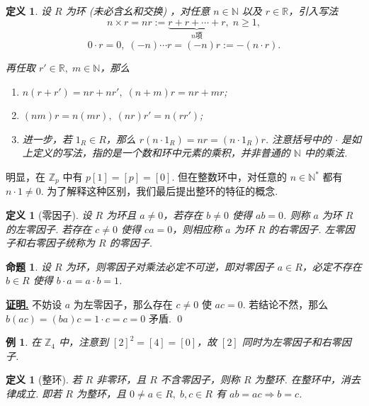 \documentclass[10pt,openany]{article}
\theoremstyle{thmstyle} %
\theoremstyle{defstyle} %
\newtheorem{definition}[theorem]{定义}
\theoremstyle{prostyle} %
\newtheorem{proposition}[theorem]{命题}
\newtheorem{example}[theorem]{例}
\renewenvironment{proof}[1][证明]{\par\underline{\textbf{#1.}} \;\fangsong}{\qed\par}
\begin{document}
\begin{definition}
	设 \( R \) 为环 (未必含幺和交换) ，对任意 \( n \in \mathbb{N} \) 以及 \( r \in \mathbb{R} \)，引入写法
	\[ n \times r=nr:=\underbrace{r+r+\cdots+r}_{n \text{项}}, \; n \geq 1, \]
	\[ 0 \cdot r =0, \; (-n) \cdots r=(-n)r:=-(n \cdot r). \]
	
	再任取 \( r' \in \mathbb{R}, \; m \in \mathbb{N} \)，那么
	\begin{enumerate}[(1)]
		\item \( n(r+r')=nr+nr', \; (n+m)r=nr+mr \);
		\item \( (nm)r=n(mr), \; (nr)r'=n(rr') \);
		\item 进一步，若 \( 1_R \in R \)，那么 \( r(n \cdot 1_R)=nr=(n \cdot 1_R)r \). 注意括号中的 \( \cdot \) 是如上定义的写法，指的是一个数和环中元素的乘积，并非普通的 \( \mathbb{N} \) 中的乘法.
	\end{enumerate}
\end{definition}

明显，在 \( \mathbb{Z}_p\) 中有 \( p[1]=[p]=[0] \). 但在整数环中，对任意的 \( n \in \mathbb{N}^* \) 都有 \( n \cdot 1 \neq 0 \). 为了解释这种区别，我们最后提出整环的特征的概念.

\begin{definition}[零因子]
	设 \( R \) 为环且 \( a \neq 0 \)，若存在 \( b \neq 0 \) 使得 \( ab=0 \). 则称 \( a \) 为环 \( R \) 的左零因子. 若存在 \( c \neq 0 \) 使得 \( ca = 0 \)，则相应称 \( a \) 为环 \( R \) 的右零因子. 左零因子和右零因子统称为 \( R \) 的零因子.
\end{definition}

\begin{proposition}
	设 \( R \) 为环，则零因子对乘法必定不可逆，即对零因子 \( a \in R \)，必定不存在 \( b \in R \) 使得 \( b \cdot a=a \cdot b=1 \).
\end{proposition}

\begin{proof}
	不妨设 \( a \) 为左零因子，那么存在 \( c \neq 0 \) 使 \( ac=0 \). 若结论不然，那么 \( b(ac)=(ba)c=1 \cdot c=c=0 \) 矛盾.
\end{proof}

\begin{example}
	在 \( \mathbb{Z}_4 \) 中，注意到 \( [2]^2=[4]=[0] \)，故 \( [2] \) 同时为左零因子和右零因子. 
\end{example}

\begin{definition}[整环]
	若 \( R \) 非零环，且 \( R \) 不含零因子，则称 \( R \) 为整环. 在整环中，消去律成立. 即若 \( R \) 为整环，且 \( 0 \neq a \in R, \; b,c \in R \) 有 \(ab=ac \Rightarrow b=c \).
\end{definition}
\end{document}
